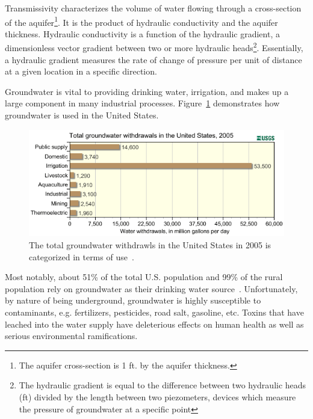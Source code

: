 \noindent Transmissivity characterizes the volume of water flowing through a
 cross-section of the aquifer\footnote{The aquifer cross-section is 1
   ft. by the aquifer thickness.}. It is the product of hydraulic
 conductivity and the aquifer thickness. Hydraulic conductivity is a
 function of the hydraulic gradient, a dimensionless vector gradient between two or more hydraulic heads\footnote{The hydraulic gradient is equal to the difference between two hydraulic heads (ft) divided by
 the length between two piezometers, devices which measure the
 pressure of groundwater at a specific point}. Essentially, a
hydraulic gradient measures the rate of change of pressure per unit of
distance at a given location in a specific direction.

Groundwater is vital
to providing drinking water, irrigation, and makes up a large
component in many industrial processes. Figure~\ref{fig:gwuse}
demonstrates how groundwater is used in the United States. 
\begin{figure}[!h]
\caption[Groundwater usage in the United States in 2005]{The total
  groundwater withdrawls in the United States in 2005 is categorized
  in terms of use~\cite{usgsgw}.}\label{fig:gwuse}
    \begin{center}
	\includegraphics[scale=0.8]{figs/gwuse.png}
    \end{center}
\end{figure}
Most
notably, about 51\% of the total U.S. population and 99\% of the
rural population rely on groundwater as their drinking water
source~\cite{gw}. Unfortunately, by nature of being underground,
groundwater is highly susceptible to contaminants, e.g. fertilizers,
pesticides, road salt, gasoline, etc. Toxins that have leached into
the water supply have deleterious effects on human health as well as
serious environmental ramifications. 

